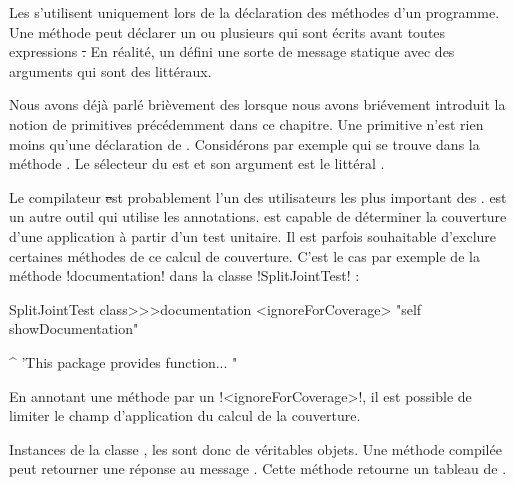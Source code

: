 \documentclass[a4paper,10pt,twoside]{book}
\begin{document}
Les \pragmas s'utilisent uniquement lors de la déclaration des méthodes d'un programme. Une méthode peut déclarer un ou plusieurs \pragmas qui sont écrits avant toutes expressions \st. En réalité, un \pragma défini une sorte de message statique avec des arguments qui sont des littéraux.

Nous avons déjà parlé brièvement des \pragmas lorsque nous avons briévement introduit la notion de primitives précédemment dans ce chapitre. Une primitive n'est rien moins qu'une déclaration de \pragma. 
Considérons par exemple  qui se trouve dans la méthode . Le sélecteur du \pragma est  et son argument est le littéral . 

Le compilateur \st est probablement l'un des utilisateurs les plus important des \pragmas. \sunit est un autre outil qui utilise les annotations. \sunit est capable de déterminer la couverture d'une application à partir d'un test unitaire. Il est parfois souhaitable d'exclure certaines méthodes de ce calcul de couverture. C'est le cas par exemple de la méthode \ct!documentation! dans la classe \ct!SplitJointTest! :

\begin{code}{}
SplitJointTest class>>>documentation
	<ignoreForCoverage>
	"self showDocumentation"
	
	^ 'This package provides function... "
\end{code}

En annotant une méthode par un \pragma \ct!<ignoreForCoverage>!, il est possible de limiter le champ d'application du calcul de la couverture.


%	


Instances de la classe , les \pragmas sont donc de véritables objets. Une méthode compilée peut retourner une réponse au message . Cette méthode retourne un tableau de \pragmas.
\end{document}
